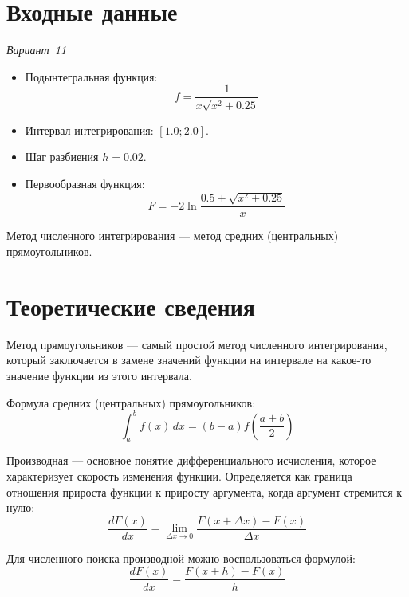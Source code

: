 \documentclass[a4paper,12pt,notitlepage,headsepline,pdftex]{scrartcl}
\begin{document}
\section{Входные данные}
  \hfill\emph{Вариант~11}

  \begin{itemize}
    \item Подынтегральная функция:
      \begin{equation}
        f = \frac{1}{x\sqrt{x^2 + 0.25}}
        \label{eq:f}
      \end{equation}
    \item Интервал интегрирования: $\left[ 1.0; 2.0 \right]$.
    \item Шаг разбиения $h = 0.02$.
    \item Первообразная функция:
      \begin{equation}
        F = -2\ln\frac{0.5 + \sqrt{x^2 + 0.25}}{x}
        \label{eq:F}
      \end{equation}
  \end{itemize}

  Метод численного интегрирования --- метод средних (центральных)
  прямоугольников.
  \newpage
\section{Теоретические сведения}
  Метод прямоугольников --- самый простой метод численного интегрирования,
  который заключается в замене значений функции на интервале на какое-то
  значение функции из этого интервала.

  Формула средних (центральных) прямоугольников:
  \begin{equation}
    \int_a^b f\left( x \right)\,dx = \left( b - a \right)f\left( \frac{a+b}{2}
    \right)
    \label{eq:cab}
  \end{equation}

  Производная --- основное понятие дифференциального исчисления, которое
  характеризует скорость изменения функции.
  Определяется как граница отношения прироста функции к приросту аргумента,
  когда аргумент стремится к нулю:
  \begin{equation}
    \frac{dF\left( x \right)}{dx} = \lim_{\Delta x \to 0}\frac{F\left( x +
    \Delta x \right) - F\left( x \right)}{\Delta x}
    \label{eq:diff}
  \end{equation}

  Для численного поиска производной можно воспользоваться формулой:
  \begin{equation}
    \frac{dF\left( x \right)}{dx} = \frac{F\left( x + h \right) - F\left(
    x \right)}{h}
    \label{eq:ndiff}
  \end{equation}
  \newpage
\end{document}
